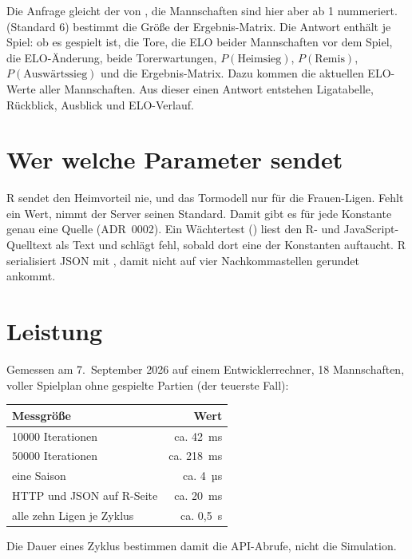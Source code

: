Die Anfrage gleicht der von , die Mannschaften sind hier
aber ab 1 nummeriert.  (Standard 6) bestimmt die Größe der
Ergebnis-Matrix. Die Antwort enthält je Spiel: ob es gespielt ist, die Tore,
die ELO beider Mannschaften vor dem Spiel, die ELO-Änderung, beide
Torerwartungen, $P(\text{Heimsieg})$, $P(\text{Remis})$,
$P(\text{Auswärtssieg})$ und die Ergebnis-Matrix. Dazu kommen die aktuellen
ELO-Werte aller Mannschaften. Aus dieser einen Antwort entstehen Ligatabelle,
Rückblick, Ausblick und ELO-Verlauf.

\section{Wer welche Parameter sendet}

R sendet den Heimvorteil nie, und das Tormodell nur für die Frauen-Ligen.
Fehlt ein Wert, nimmt der Server seinen Standard. Damit gibt es für jede
Konstante genau eine Quelle (ADR~0002). Ein Wächtertest
() liest den R- und
JavaScript-Quelltext als Text und schlägt fehl, sobald dort eine der
Konstanten auftaucht. R serialisiert JSON mit , damit
 nicht auf vier Nachkommastellen gerundet ankommt.

\section{Leistung}

Gemessen am 7.~September 2026 auf einem Entwicklerrechner, 18 Mannschaften,
voller Spielplan ohne gespielte Partien (der teuerste Fall):

\begin{center}
\small
\begin{tabular}{@{}lr@{}}
\toprule
Messgröße & Wert \\
\midrule
\num{10000} Iterationen & ca. 42~ms \\
\num{50000} Iterationen & ca. 218~ms \\
eine Saison & ca. 4~µs \\
HTTP und JSON auf R-Seite & ca. 20~ms \\
alle zehn Ligen je Zyklus & ca. 0{,}5~s \\
\bottomrule
\end{tabular}
\end{center}

Die Dauer eines Zyklus bestimmen damit die API-Abrufe, nicht die
Simulation.
